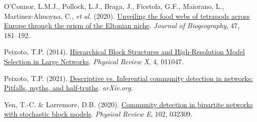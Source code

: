\documentclass[
]{article}
\newlength{\cslhangindent}
\newlength{\cslentryspacingunit} %
\newenvironment{CSLReferences}[2] %
 {%
  \setlength{\parindent}{0pt}
  \ifodd #1
  \let\oldpar\par
  \def\par{\hangindent=\cslhangindent\oldpar}
  \fi
  \setlength{\parskip}{#2\cslentryspacingunit}
 }%
 {}
\begin{document}
\begin{CSLReferences}{1}{0}
\leavevmode{}%
O'Connor, L.M.J., Pollock, L.J., Braga, J., Ficetola, G.F., Maiorano,
L., Martinez-Almoyna, C., \emph{et al.} (2020).
\href{https://doi.org/10.1111/jbi.13773}{Unveiling the food webs of
tetrapods across {Europe} through the prism of the {Eltonian} niche}.
\emph{Journal of Biogeography}, 47, 181--192.

\leavevmode{}%
Peixoto, T.P. (2014).
\href{https://doi.org/10.1103/PhysRevX.4.011047}{Hierarchical {Block
Structures} and {High-Resolution Model Selection} in {Large Networks}}.
\emph{Physical Review X}, 4, 011047.

\leavevmode{}%
Peixoto, T.P. (2021).
\href{https://doi.org/10.1017/9781009118897}{Descriptive vs. Inferential
community detection in networks: Pitfalls, myths, and half-truths}.
\emph{arXiv.org}.

\leavevmode{}%
Yen, T.-C. \& Larremore, D.B. (2020).
\href{https://doi.org/10.1103/PhysRevE.102.032309}{Community detection
in bipartite networks with stochastic block models}. \emph{Physical
Review E}, 102, 032309.

\end{CSLReferences}
\end{document}
